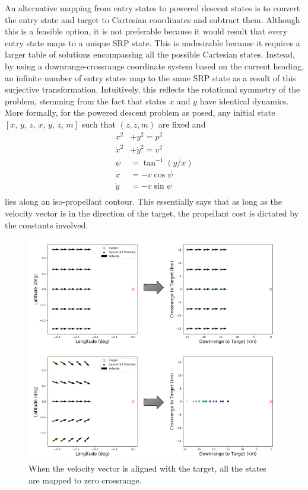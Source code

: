 \documentclass[letterpaper, preprint, paper,11pt]{AAS}
\begin{document}
An alternative mapping from entry states to powered descent states is to convert the entry state and target to Cartesian coordinates and subtract them. Although this is a feasible option, it is not preferable because it would result that every entry state maps to a unique SRP state. This is undesirable because it requires a larger table of solutions encompassing all the possible Cartesian states. Instead, by using a downrange-crossrange coordinate system based on the current heading, an infinite number of entry states map to the same SRP state as a result of this surjective transformation. Intuitively, this reflects the rotational symmetry of the problem, stemming from the fact that states $ x $ and $ y $ have identical dynamics. More formally, for the powered descent problem as posed, any initial state $[ x,\, y,\, z,\, \dot{x},\, \dot{y},\, \dot{z},\, m]$ such that $(z, \dot{z}, m)$ are fixed and 
\begin{align}
x^2 &+ y^2 = p^2 \\
\dot{x}^2 &+ \dot{y}^2 = v^2 \\
\psi &= \tan^{-1}(y/x) \\
\dot{x} &= -v\cos\psi \\
\dot{y} &= -v\sin\psi \\
\end{align}
lies along an iso-propellant contour. This essentially says that as long as the velocity vector is in the direction of the target, the propellant cost is dictated by the constants involved.
\begin{figure}[h!]
	\centering
	\includegraphics[width=1\textwidth]{EntryToSRP} 
	\caption{When the velocity vector is aligned with the target, all the states are mapped to zero crossrange.}
	\label{fig_entry_to_srp}
\end{figure}
\end{document}
